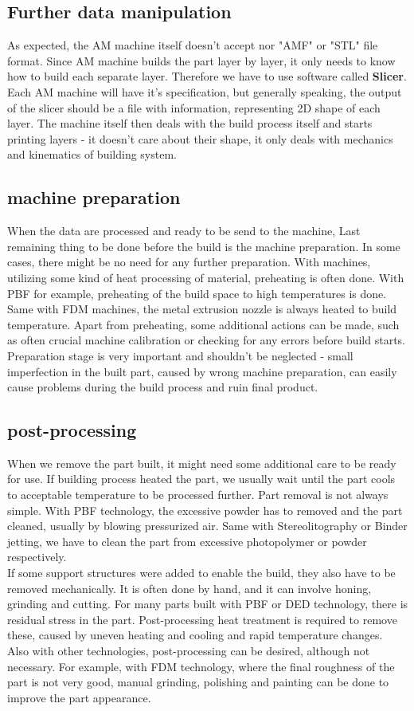 \documentclass[a4paper]{report}
\begin{document}
\subsection{Further data manipulation}
As expected, the AM machine itself doesn't accept nor "AMF" or "STL" file format. Since AM machine builds the part layer by layer, it only needs to know how to build each separate layer. Therefore we have to use software called \textbf{Slicer}. Each AM machine will have it's specification, but generally speaking, the output of the slicer should be a file with information, representing 2D shape of each layer. The machine itself then deals with the build process itself and starts printing layers - it doesn't care about their shape, it only deals with mechanics and kinematics of building system.
\subsection{machine preparation}
When the data are processed and ready to be send to the machine, Last remaining thing to be done before the build is the machine preparation. In some cases, there might be no need for any further preparation. With machines, utilizing some kind of heat processing of material, preheating is often done. With PBF for example, preheating of the build space to high temperatures is done. Same with FDM machines, the metal extrusion nozzle is always heated to build temperature. Apart from preheating, some additional actions can be made, such as often crucial machine calibration or checking for any errors before build starts. Preparation stage is very important and shouldn't be neglected - small imperfection in the built part, caused by wrong machine preparation, can easily cause problems during the build process and ruin final product.
\subsection{post-processing}
When we remove the part built, it might need some additional care to be ready for use. If building process heated the part, we usually wait until the part cools to acceptable temperature to be processed further. Part removal is not always simple. With PBF technology, the excessive powder has to removed and the part cleaned, usually by blowing pressurized air. Same with Stereolitography or Binder jetting, we have to clean the part from excessive photopolymer or powder respectively.\\
If some support structures were added to enable the build, they also have to be removed mechanically. It is often done by hand, and it can involve honing, grinding and cutting. For many parts built with PBF or DED technology, there is residual stress in the part. Post-processing heat treatment is required to remove these, caused by uneven heating and cooling and rapid temperature changes.\\
Also with other technologies, post-processing can be desired, although not necessary. For example, with FDM technology, where the final roughness of the part is not very good, manual grinding, polishing and painting can be done to improve the part appearance.
\end{document}
